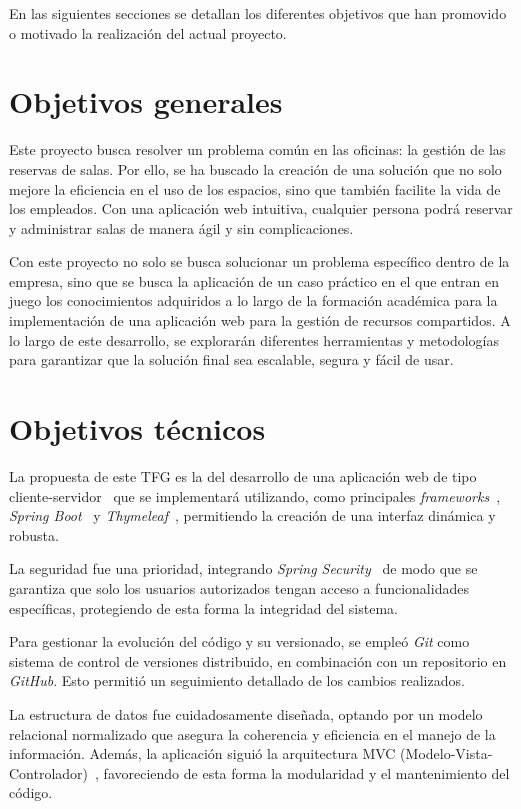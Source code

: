
En las siguientes secciones se detallan los diferentes objetivos que han promovido o motivado la realización del actual proyecto.

\section{Objetivos generales}\label{objetivos-generales}
Este proyecto busca resolver un problema común en las oficinas: la gestión de las reservas de salas. Por ello, se ha buscado la creación de una solución que no solo mejore la eficiencia en el uso de los espacios, sino que también facilite la vida de los empleados. Con una aplicación web intuitiva, cualquier persona podrá reservar y administrar salas de manera ágil y sin complicaciones.

Con este proyecto no solo se busca solucionar un problema específico dentro de la empresa, sino que se busca la aplicación de un caso práctico en el que entran en juego los conocimientos adquiridos a lo largo de la formación académica para la implementación de una aplicación web para la gestión de recursos compartidos. A lo largo de este desarrollo, se explorarán diferentes herramientas y metodologías para garantizar que la solución final sea escalable, segura y fácil de usar.

\section{Objetivos técnicos}\label{objetivos-tecnicos}
La propuesta de este TFG es la del desarrollo de una aplicación web de tipo cliente-servidor~\cite{client-server-model} que se implementará utilizando, como principales \emph{frameworks}~\cite{framework}, \textit{Spring Boot}~\cite{spring-boot} y \textit{Thymeleaf}~\cite{thymeleaf}, permitiendo la creación de una interfaz dinámica y robusta.

La seguridad fue una prioridad, integrando \textit{Spring Security}~\cite{spring-security} de modo que se garantiza que solo los usuarios autorizados tengan acceso a funcionalidades específicas, protegiendo de esta forma la integridad del sistema.

Para gestionar la evolución del código y su versionado, se empleó \textit{Git} como sistema de control de versiones distribuido, en combinación con un repositorio en \textit{GitHub}. Esto permitió un seguimiento detallado de los cambios realizados.

La estructura de datos fue cuidadosamente diseñada, optando por un modelo relacional normalizado que asegura la coherencia y eficiencia en el manejo de la información. Además, la aplicación siguió la arquitectura MVC (Modelo-Vista-Controlador)~\cite{modelo-vista-controrlador}, favoreciendo de esta forma la modularidad y el mantenimiento del código.

